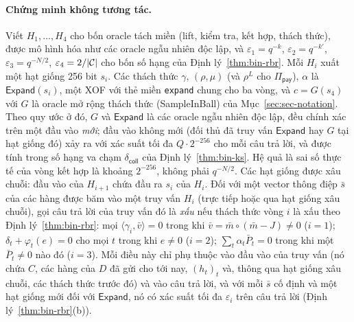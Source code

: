 \paragraph{Chứng minh không tương tác.}
Viết $H_1,\dots,H_4$ cho bốn oracle tách miền (lift, kiểm tra, kết hợp, thách
thức), được mô hình hóa như các oracle ngẫu nhiên độc lập, và
$\varepsilon_1=q^{-k}$, $\varepsilon_2=q^{-k'}$, $\varepsilon_3=q^{-N/2}$,
$\varepsilon_4=2/|\mathcal{C}|$ cho bốn số hạng của Định lý~\ref{thm:bin-rbr}.
Mỗi $H_i$ xuất một hạt giống 256 bit $s_i$. Các thách thức
$\gamma$, $(\rho,\mu)$ (và $\rho^L$ cho $\Pi_{\mathsf{pay}}$), $\alpha$ là
$\mathsf{Expand}(s_i)$, một XOF với thẻ miền \texttt{expand} chung cho ba vòng,
và $c=G(s_4)$ với $G$ là oracle mở rộng thách thức (\textsf{SampleInBall}) của
Mục~\ref{sec:sec-notation}. Theo quy ước ở đó, $G$ và $\mathsf{Expand}$ là các
oracle ngẫu nhiên độc lập, đều chính xác trên một đầu vào \emph{mới}; đầu vào
không mới (đối thủ đã truy vấn $\mathsf{Expand}$ hay $G$ tại hạt giống đó) xảy ra
với xác suất tối đa $Q\cdot2^{-256}$ cho mỗi câu trả lời, và được tính trong số
hạng va chạm $\delta_{\mathsf{coll}}$ của Định lý~\ref{thm:bin-ks}. Hệ quả là
sai số thực tế của vòng kết hợp là khoảng $2^{-256}$, không phải $q^{-N/2}$.
Các hạt giống được xâu chuỗi: đầu vào của $H_{i+1}$ chứa đầu ra $s_i$
của $H_i$. Đối với một vector thông điệp $\bar s$ của các hàng
được băm vào một truy vấn $H_i$ (trực tiếp hoặc qua hạt giống xâu chuỗi), gọi câu
trả lời của truy vấn đó là \emph{xấu} nếu thách thức vòng $i$ là xấu theo
Định lý~\ref{thm:bin-rbr}:
mọi $\langle\gamma_i,\bar v\rangle=0$ trong khi $\bar v=\bar m\circ(\bar m-J)\ne0$
($i=1$); $\delta_t+\varphi_t(e)=0$ cho mọi $t$ trong khi $e\ne0$ ($i=2$);
$\sum_t\alpha_t\bar P_t=0$ trong khi một $\bar P_t\ne0$ nào đó ($i=3$). Mỗi điều
này chỉ phụ thuộc vào đầu vào của truy vấn (nó chứa $C$, các hàng của $D$ đã gửi
cho tới nay, $(h_t)_t$ và, thông qua hạt giống xâu chuỗi, các thách thức trước
đó) và vào câu trả lời, và với mỗi $\bar s$ cố định và một hạt giống mới đối với
$\mathsf{Expand}$, nó có xác suất tối đa $\varepsilon_i$ trên câu trả lời
(Định lý~\ref{thm:bin-rbr}(b)).

